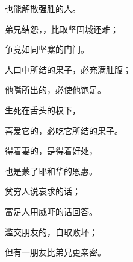 {\par }{\Q 也能解散强胜的人。
\par }{\Q {}弟兄结怨，{}，比取坚固城还难；
\par }{争竞如同坚寨的门闩。
\par }{\Q {}人口中所结的果子，必充满肚腹；
\par }{\Q 他嘴所出的，必使他饱足。
\par }{\Q {}生死在舌头的权下，
\par }{\Q 喜爱它的，必吃它所结的果子。
\par }{\Q {}得着{}妻的，是得着好处，
\par }{\Q 也是蒙了耶和华的恩惠。
\par }{\Q {}贫穷人说哀求的话；
\par }{\Q 富足人用威吓的话回答。
\par }{\Q {}滥交朋友的，自取败坏；
\par }{\Q 但有一朋友比弟兄更亲密。

}
